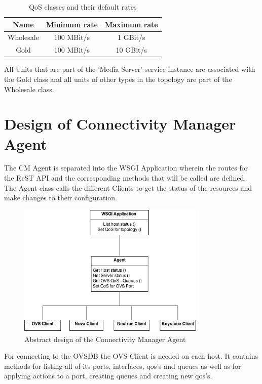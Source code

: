 \begin{table}[H]
\centering

\begin{tabular}{|c|c|c|}
\hline \textbf{Name} & Minimum rate & Maximum rate \\ 
\hline Wholesale & 100 MBit/s & 1 GBit/s \\ 
\hline Gold & 100 MBit/s & 10 GBit/s \\ 
\hline 
\end{tabular} 

\caption{QoS classes and their default rates}
\end{table}


All Units that are part of the 'Media Server' service instance are associated with the Gold class and all units of other types in the topology are part of the Wholesale class.


\newpage
\section{Design of Connectivity Manager Agent}

The CM Agent is separated into the WSGI Application wherein the routes for the ReST API and the corresponding methods that will be called are defined. The Agent class calls the different Clients to get the status of the resources and make changes to their configuration.

\begin{figure}[H]
\centering

\includegraphics[width=0.8\textwidth]{images/design/cm_agent_design_class_diagram.png}

\caption{Abstract design of the Connectivity Manager Agent}
\end{figure}

For connecting to the OVSDB the OVS Client is needed on each host. It contains methods for listing all of its ports, interfaces, qos's and queues as well as for applying actions to a port, creating queues and creating new qos's.

